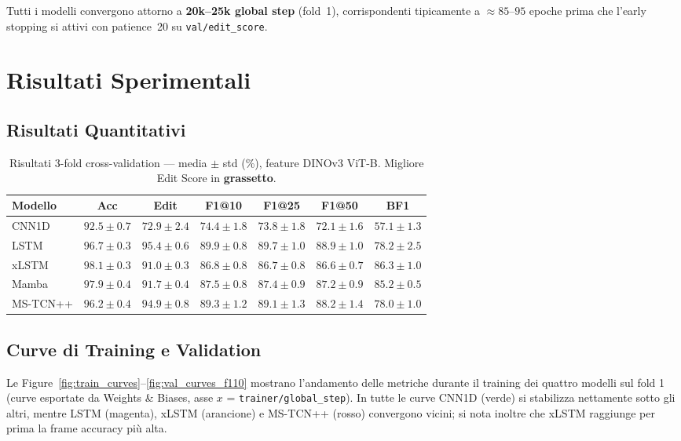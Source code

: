 \documentclass[12pt, a4paper]{article}
\begin{document}
Tutti i modelli convergono attorno a \textbf{20k--25k global step} (fold~1),
corrispondenti tipicamente a $\approx 85$--$95$ epoche prima che l'early stopping
si attivi con patience~20 su \texttt{val/edit\_score}.

\section{Risultati Sperimentali}
\label{sec:risultati}

\subsection{Risultati Quantitativi}

\begin{table}[H]
\centering
\caption{Risultati 3-fold cross-validation --- media $\pm$ std (\%),
         feature DINOv3 ViT-B.
         Migliore Edit Score in \textbf{grassetto}.}
\label{tab:results}
\begin{tabular}{lcccccc}
\toprule
\textbf{Modello} & \textbf{Acc} & \textbf{Edit}
& \textbf{F1@10} & \textbf{F1@25} & \textbf{F1@50} & \textbf{BF1} \\
\midrule
CNN1D    & $92.5{\pm}0.7$ & $72.9{\pm}2.4$          & $74.4{\pm}1.8$ & $73.8{\pm}1.8$ & $72.1{\pm}1.6$ & $57.1{\pm}1.3$ \\
LSTM     & $96.7{\pm}0.3$ & $\mathbf{95.4{\pm}0.6}$ & $89.9{\pm}0.8$ & $89.7{\pm}1.0$ & $88.9{\pm}1.0$ & $78.2{\pm}2.5$ \\
xLSTM    & $\mathbf{98.1{\pm}0.3}$ & $91.0{\pm}0.3$ & $86.8{\pm}0.8$ & $86.7{\pm}0.8$ & $86.6{\pm}0.7$ & $\mathbf{86.3{\pm}1.0}$ \\
Mamba    & $97.9{\pm}0.4$ & $91.7{\pm}0.4$          & $87.5{\pm}0.8$ & $87.4{\pm}0.9$ & $87.2{\pm}0.9$ & $85.2{\pm}0.5$ \\
MS-TCN++ & $96.2{\pm}0.4$ & $94.9{\pm}0.8$          & $89.3{\pm}1.2$ & $89.1{\pm}1.3$ & $88.2{\pm}1.4$ & $78.0{\pm}1.0$ \\
\bottomrule
\end{tabular}
\end{table}

\subsection{Curve di Training e Validation}

Le Figure~\ref{fig:train_curves}--\ref{fig:val_curves_f110} mostrano l'andamento
delle metriche durante il training dei quattro modelli sul fold 1 (curve
esportate da Weights \& Biases, asse $x$ = \texttt{trainer/global\_step}).
In tutte le curve CNN1D (verde) si stabilizza nettamente sotto gli altri,
mentre LSTM (magenta), xLSTM (arancione) e MS-TCN++ (rosso) convergono vicini;
si nota inoltre che xLSTM raggiunge per prima la frame accuracy pi\`u alta.
\end{document}
